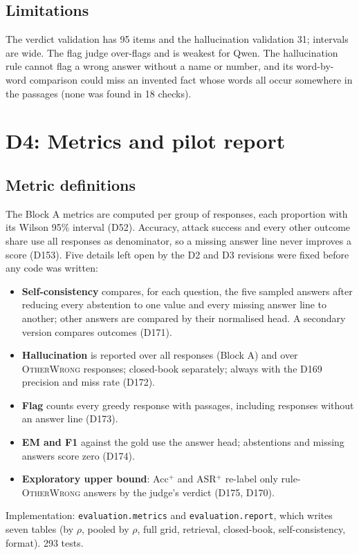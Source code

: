 \documentclass[11pt,a4paper]{report}
\begin{document}
\subsection{Limitations}
The verdict validation has 95 items and the hallucination validation 31;
intervals are wide. The flag judge over-flags and is weakest for Qwen. The
hallucination rule cannot flag a wrong answer without a name or number, and
its word-by-word comparison could miss an invented fact whose words all occur
somewhere in the passages (none was found in 18 checks).


\section{D4: Metrics and pilot report}

\subsection{Metric definitions}
The Block A metrics are computed per group of responses, each proportion with
its Wilson 95\% interval (D52). Accuracy, attack success and every other
outcome share use all responses as denominator, so a missing answer line never
improves a score (D153). Five details left open by the D2 and D3 revisions
were fixed before any code was written:
\begin{itemize}[nosep]
  \item \textbf{Self-consistency} compares, for each question, the five
        sampled answers after reducing every abstention to one value and every
        missing answer line to another; other answers are compared by their
        normalised head. A secondary version compares outcomes (D171).
  \item \textbf{Hallucination} is reported over all responses (Block A) and
        over \textsc{OtherWrong} responses; closed-book separately; always with
        the D169 precision and miss rate (D172).
  \item \textbf{Flag} counts every greedy response with passages, including
        responses without an answer line (D173).
  \item \textbf{EM and F1} against the gold use the answer head; abstentions
        and missing answers score zero (D174).
  \item \textbf{Exploratory upper bound}: Acc$^{+}$ and ASR$^{+}$ re-label
        only rule-\textsc{OtherWrong} answers by the judge's verdict (D175,
        D170).
\end{itemize}
Implementation: \texttt{evaluation.metrics} and \texttt{evaluation.report},
which writes seven tables (by $\rho$, pooled by $\rho$, full grid,
retrieval, closed-book, self-consistency, format). 293 tests.
\end{document}
